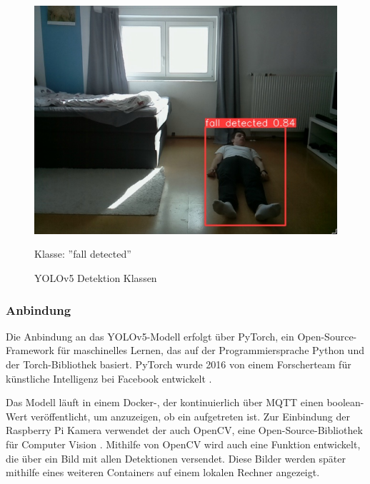 \begin{figure}[H]
\begin{minipage}[b]{0.3\textwidth}
		\includegraphics[width=\textwidth]{images/fallen.png}
		\caption*{Klasse: ''fall detected''}
	\end{minipage}
	\caption{YOLOv5 Detektion Klassen}
	\label{fig:yolo_classes}
\end{figure}



\subsubsection{Anbindung}
Die Anbindung an das YOLOv5-Modell erfolgt über PyTorch, ein Open-Source-Framework für maschinelles Lernen, das auf der Programmiersprache Python und der Torch-Bibliothek basiert. PyTorch wurde 2016 von einem Forscherteam für künstliche Intelligenz bei Facebook entwickelt \cite{noauthor_pytorch_nodate}.

Das Modell läuft in einem Docker-, der kontinuierlich über MQTT einen boolean-Wert veröffentlicht, um anzuzeigen, ob ein  aufgetreten ist. Zur Einbindung der Raspberry Pi Kamera verwendet der  auch OpenCV, eine Open-Source-Bibliothek für Computer Vision \cite{OpenCV}. Mithilfe von OpenCV wird auch eine Funktion entwickelt, die über  ein Bild mit allen Detektionen versendet. Diese Bilder werden später mithilfe eines weiteren  Containers auf einem lokalen Rechner angezeigt.




